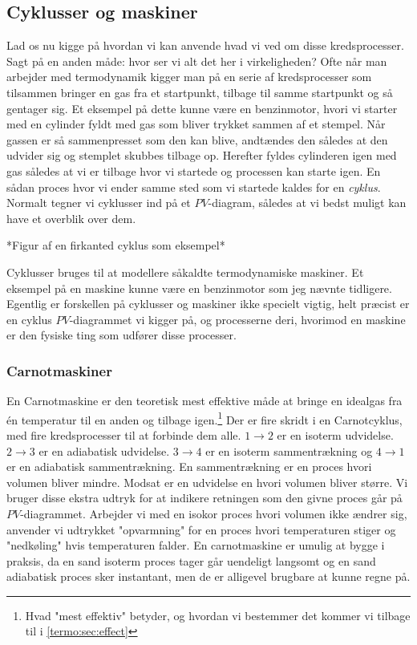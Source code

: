 \documentclass[crop=false, class=memoir]{standalone}
\begin{document}
\subsection{Cyklusser og maskiner}

Lad os nu kigge på hvordan vi kan anvende hvad vi ved om disse kredsprocesser. Sagt på en anden måde: hvor ser vi alt det her i virkeligheden? Ofte når man arbejder med termodynamik kigger man på en serie af kredsprocesser som tilsammen bringer en gas fra et startpunkt, tilbage til samme startpunkt og så gentager sig. Et eksempel på dette kunne være en benzinmotor, hvori vi starter med en cylinder fyldt med gas som bliver trykket sammen af et stempel. Når gassen er så sammenpresset som den kan blive, andtændes den således at den udvider sig og stemplet skubbes tilbage op. Herefter fyldes cylinderen igen med gas således at vi er tilbage hvor vi startede og processen kan starte igen. En sådan proces hvor vi ender samme sted som vi startede kaldes for en \emph{cyklus}. Normalt tegner vi cyklusser ind på et $PV$-diagram, således at vi bedst muligt kan have et overblik over dem. 

*Figur af en firkanted cyklus som eksempel*

Cyklusser bruges til at modellere såkaldte termodynamiske maskiner. Et eksempel på en maskine kunne være en benzinmotor som jeg nævnte tidligere. Egentlig er forskellen på cyklusser og maskiner ikke specielt vigtig, helt præcist er en cyklus $PV$-diagrammet vi kigger på, og processerne deri, hvorimod en maskine er den fysiske ting som udfører disse processer.

\subsubsection{Carnotmaskiner}

En Carnotmaskine er den teoretisk mest effektive måde at bringe en idealgas fra én temperatur til en anden og tilbage igen.\footnote{Hvad "mest effektiv" betyder, og hvordan vi bestemmer det kommer vi tilbage til i \cref{termo:sec:effect}} Der er fire skridt i en Carnotcyklus, med fire kredsprocesser til at forbinde dem alle. $1\rightarrow 2$ er en isoterm udvidelse. $2\rightarrow 3$ er en adiabatisk udvidelse. $3\rightarrow 4$ er en isoterm sammentrækning og $4\rightarrow 1$ er en adiabatisk sammentrækning. En sammentrækning er en proces hvori volumen bliver mindre. Modsat er en udvidelse en hvori volumen bliver større. Vi bruger disse ekstra udtryk for at indikere retningen som den givne proces går på $PV$-diagrammet. Arbejder vi med en isokor proces hvori volumen ikke ændrer sig, anvender vi udtrykket "opvarmning" for en proces hvori temperaturen stiger og "nedkøling" hvis temperaturen falder. En carnotmaskine er umulig at bygge i praksis, da en sand isoterm proces tager går uendeligt langsomt og en sand adiabatisk proces sker instantant, men de er alligevel brugbare at kunne regne på. 
\end{document}
